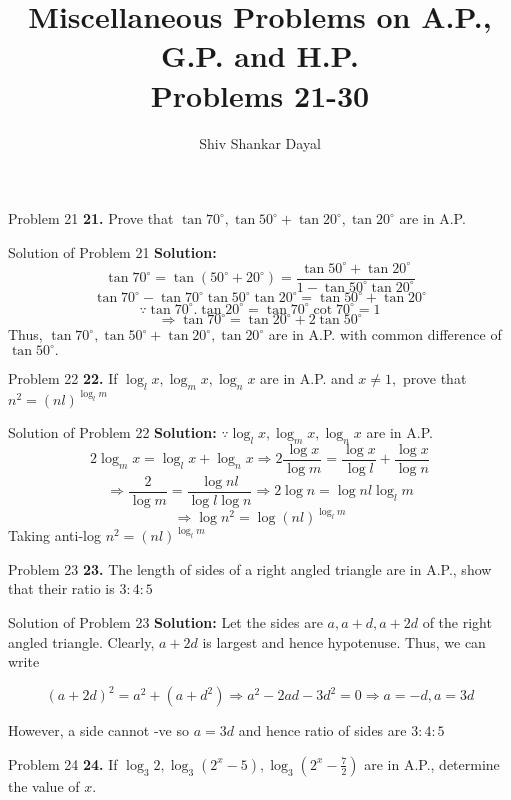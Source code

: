 \documentclass[aspectratio=1610,8pt]{beamer}
\title{Miscellaneous Problems on A.P., G.P. and H.P.\\Problems 21-30}
\author[Shiv Shankar Dayal]{Shiv Shankar Dayal}
\begin{document}
\begin{frame}
  \titlepage
\end{frame}
\begin{frame}{Problem 21}
  \textbf{21.} Prove that $\tan 70^\circ, \tan 50^\circ + \tan 20^\circ, \tan 20^\circ$ are in A.P.
\end{frame}
\begin{frame}{Solution of Problem 21}
  \textbf{Solution:} $$\tan70^\circ = \tan(50^\circ + 20^\circ) = \frac{\tan50^\circ + \tan 20^\circ}{1 - \tan50^\circ\tan20^\circ}$$
  $$\tan70^\circ - \tan70^\circ\tan50^\circ\tan20^\circ = \tan50^\circ + \tan 20^\circ$$
  $$\because \tan70^\circ.\tan20^\circ = \tan70^\circ\cot70^\circ = 1$$
  $$\Rightarrow \tan70^\circ = \tan20^\circ + 2\tan50^\circ$$
  Thus, $\tan 70^\circ, \tan 50^\circ + \tan 20^\circ, \tan 20^\circ$ are in A.P. with common difference of $\tan50^\circ.$
\end{frame}
\begin{frame}{Problem 22}
  \textbf{22.} If $\log_l x, \log_m x, \log_n x$ are in A.P. and $x \neq 1,$ prove that $n^2 = (nl)^{\log_l m}$
\end{frame}
\begin{frame}{Solution of Problem 22}
  \textbf{Solution:} $\because \log_l x, \log_m x, \log_n x$ are in A.P.
  $$2\log_m x = \log_l x + \log_n x \Rightarrow 2\frac{\log x}{\log m} = \frac{\log x}{\log l} + \frac{\log x}{\log n}$$
  $$\Rightarrow \frac{2}{\log m} = \frac{\log nl}{\log l\log n}\Rightarrow 2\log n = \log nl\log_l m$$
  $$\Rightarrow \log n^2 = \log (nl)^{\log_l m}$$
  Taking anti-log $n^2 = (nl)^{\log_l m}$
\end{frame}
\begin{frame}{Problem 23}
  \textbf{23.} The length of sides of a right angled triangle are in A.P., show that their ratio is $3:4:5$
\end{frame}
\begin{frame}{Solution of Problem 23}
  \textbf{Solution:} Let the sides are $a, a + d, a + 2d$ of the right angled triangle. Clearly, $a + 2d$ is largest and hence
  hypotenuse. Thus, we can write

  $$(a + 2d)^2 = a^2 + (a + d^2) \Rightarrow a^2 - 2ad - 3d^2 = 0 \Rightarrow a = -d, a = 3d$$

  However, a side cannot -ve so $a = 3d$ and hence ratio of sides are $3:4:5$
\end{frame}
\begin{frame}{Problem 24}
  \textbf{24.} If $\log_3 2, \log_3(2^x - 5), \log_3\left(2^x - \frac{7}{2}\right)$ are in A.P., determine the value of $x.$
\end{frame}
\end{document}
